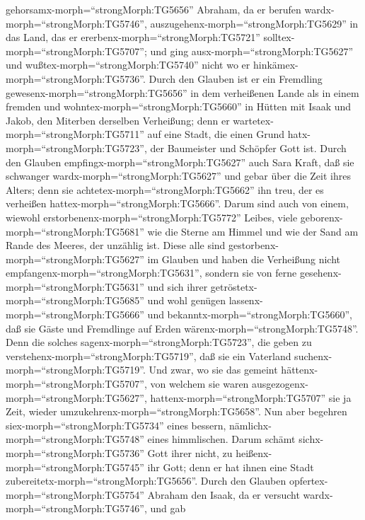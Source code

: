 gehorsamx-morph=``strongMorph:TG5656'' Abraham, da er berufen
wardx-morph=``strongMorph:TG5746'',
auszugehenx-morph=``strongMorph:TG5629'' in das Land, das er
ererbenx-morph=``strongMorph:TG5721''
solltex-morph=``strongMorph:TG5707''; und ging
ausx-morph=``strongMorph:TG5627'' und
wußtex-morph=``strongMorph:TG5740'' nicht wo er
hinkämex-morph=``strongMorph:TG5736''.  Durch den Glauben
ist er ein Fremdling gewesenx-morph=``strongMorph:TG5656'' in dem
verheißenen Lande als in einem fremden und
wohntex-morph=``strongMorph:TG5660'' in Hütten mit Isaak und Jakob, den
Miterben derselben Verheißung;  denn er
wartetex-morph=``strongMorph:TG5711'' auf eine Stadt, die einen Grund
hatx-morph=``strongMorph:TG5723'', der Baumeister und Schöpfer Gott ist.
 Durch den Glauben empfingx-morph=``strongMorph:TG5627''
auch Sara Kraft, daß sie schwanger wardx-morph=``strongMorph:TG5627''
und gebar über die Zeit ihres Alters; denn sie
achtetex-morph=``strongMorph:TG5662'' ihn treu, der es verheißen
hattex-morph=``strongMorph:TG5666''.  Darum sind auch von
einem, wiewohl erstorbenenx-morph=``strongMorph:TG5772'' Leibes, viele
geborenx-morph=``strongMorph:TG5681'' wie die Sterne am Himmel und wie
der Sand am Rande des Meeres, der unzählig ist.  Diese alle
sind gestorbenx-morph=``strongMorph:TG5627'' im Glauben und haben die
Verheißung nicht empfangenx-morph=``strongMorph:TG5631'', sondern sie
von ferne gesehenx-morph=``strongMorph:TG5631'' und sich ihrer
getröstetx-morph=``strongMorph:TG5685'' und wohl genügen
lassenx-morph=``strongMorph:TG5666'' und
bekanntx-morph=``strongMorph:TG5660'', daß sie Gäste und Fremdlinge auf
Erden wärenx-morph=``strongMorph:TG5748''.  Denn die
solches sagenx-morph=``strongMorph:TG5723'', die geben zu
verstehenx-morph=``strongMorph:TG5719'', daß sie ein Vaterland
suchenx-morph=``strongMorph:TG5719''.  Und zwar, wo sie das
gemeint hättenx-morph=``strongMorph:TG5707'', von welchem sie waren
ausgezogenx-morph=``strongMorph:TG5627'',
hattenx-morph=``strongMorph:TG5707'' sie ja Zeit, wieder
umzukehrenx-morph=``strongMorph:TG5658''.  Nun aber
begehren siex-morph=``strongMorph:TG5734'' eines bessern,
nämlichx-morph=``strongMorph:TG5748'' eines himmlischen. Darum schämt
sichx-morph=``strongMorph:TG5736'' Gott ihrer nicht, zu
heißenx-morph=``strongMorph:TG5745'' ihr Gott; denn er hat ihnen eine
Stadt zubereitetx-morph=``strongMorph:TG5656''.  Durch den
Glauben opfertex-morph=``strongMorph:TG5754'' Abraham den Isaak, da er
versucht wardx-morph=``strongMorph:TG5746'', und gab
